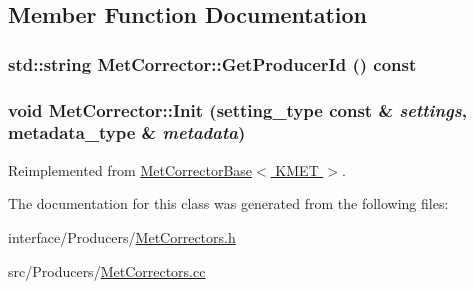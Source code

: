 \subsection{Member Function Documentation}
\hypertarget{classMetCorrector_a54cdd5649b20081da2e3121a97b7d597}{
\subsubsection[{GetProducerId}]{\setlength{\rightskip}{0pt plus 5cm}std::string MetCorrector::GetProducerId () const}}
\label{classMetCorrector_a54cdd5649b20081da2e3121a97b7d597}
\hypertarget{classMetCorrector_a6ee5bc3ba9731e73c395057f47e86f67}{
\subsubsection[{Init}]{\setlength{\rightskip}{0pt plus 5cm}void MetCorrector::Init (setting\_\-type const \& {\em settings}, \/  metadata\_\-type \& {\em metadata})}}
\label{classMetCorrector_a6ee5bc3ba9731e73c395057f47e86f67}


Reimplemented from \hyperlink{classMetCorrectorBase_a16b625ee626c0cead5c6c4d65ac180e4}{MetCorrectorBase$<$ KMET $>$}.

The documentation for this class was generated from the following files:\begin{DoxyCompactItemize}
\item 
interface/Producers/\hyperlink{MetCorrectors_8h}{MetCorrectors.h}\item 
src/Producers/\hyperlink{MetCorrectors_8cc}{MetCorrectors.cc}\end{DoxyCompactItemize}
